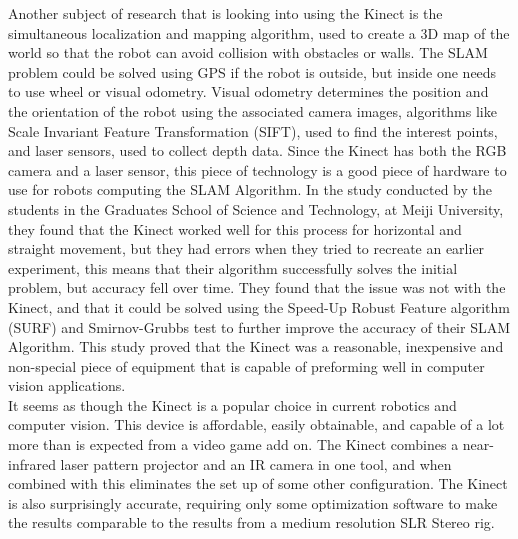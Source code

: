 \documentclass[12pt,twocolumn]{article}
\begin{document}
\indent	Another subject of research that is looking into using the Kinect is the simultaneous localization and mapping algorithm, used to create a 3D map of the world so that the robot can avoid collision with obstacles or walls. The SLAM problem could be solved using GPS if the robot is outside, but inside one needs to use wheel or visual odometry. Visual odometry determines the position and the orientation of the robot using the associated camera images, algorithms like Scale Invariant Feature Transformation (SIFT), used to find the interest points, and laser sensors, used to collect depth data. Since the Kinect has both the RGB camera and a laser sensor, this piece of technology is a good piece of hardware to use for robots computing the SLAM Algorithm. In the study conducted by the students in the Graduates School of Science and Technology, at Meiji University, they found that the Kinect worked well for this process for horizontal and straight movement, but they had errors when they tried to recreate an earlier experiment, this means that their algorithm successfully solves the initial problem, but accuracy fell over time.  \cite{cite2} They found that the issue was not with the Kinect, and that it could be solved using the Speed-Up Robust Feature algorithm (SURF) and Smirnov-Grubbs test to further improve the accuracy of their SLAM Algorithm. This study proved that the Kinect was a reasonable, inexpensive and non-special piece of equipment that is capable of preforming well in computer vision applications. \\
\indent	It seems as though the Kinect is a popular choice in current robotics and computer vision. This device is affordable, easily obtainable, and capable of a lot more than is expected from a video game add on. The Kinect combines a near-infrared laser pattern projector and an IR camera in one tool, and when combined with this eliminates the set up of some other configuration. The Kinect is also surprisingly accurate, requiring only some optimization software to make the results comparable to the results from a medium resolution SLR Stereo rig.
\end{document}
